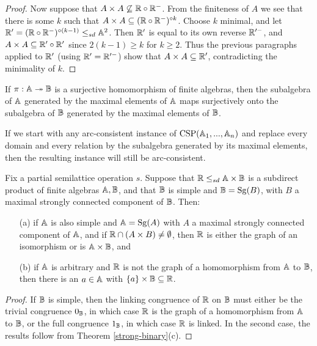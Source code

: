 \documentclass[letterpaper,11pt]{article}
\DeclareMathOperator{\CSP}{CSP}
\DeclareMathOperator{\Sg}{Sg}
\begin{document}
\begin{proof}
Now suppose that $A \times A \not\subseteq \mathbb{R}\circ \mathbb{R}^-$. From the finiteness of $A$ we see that there is some $k$ such that $A \times A \subseteq (\mathbb{R}\circ \mathbb{R}^-)^{\circ k}$. Choose $k$ minimal, and let $\mathbb{R}' = (\mathbb{R} \circ \mathbb{R}^-)^{\circ (k-1)} \le_{sd} \mathbb{A}^2$. Then $\mathbb{R}'$ is equal to its own reverse $\mathbb{R}'^-$, and $A \times A \subseteq \mathbb{R}' \circ \mathbb{R}'$ since $2(k-1) \ge k$ for $k \ge 2$. Thus the previous paragraphs applied to $\mathbb{R}'$ (using $\mathbb{R}' = \mathbb{R}'^-$) show that $A \times A \subseteq \mathbb{R}'$, contradicting the minimality of $k$.
\end{proof}


\begin{cor}\label{maximal-projection} If $\pi : \mathbb{A} \twoheadrightarrow \mathbb{B}$ is a surjective homomorphism of finite algebras, then the subalgebra of $\mathbb{A}$ generated by the maximal elements of $\mathbb{A}$ maps surjectively onto the subalgebra of $\mathbb{B}$ generated by the maximal elements of $\mathbb{B}$.
\end{cor}

\begin{cor} If we start with any arc-consistent instance of $\CSP(\bA_1, ..., \bA_n)$ and replace every domain and every relation by the subalgebra generated by its maximal elements, then the resulting instance will still be arc-consistent.
\end{cor}

\begin{cor}\label{strong-simple} Fix a partial semilattice operation $s$. Suppose that $\mathbb{R} \le_{sd} \mathbb{A}\times \mathbb{B}$ is a subdirect product of finite algebras $\mathbb{A}, \mathbb{B}$, and that $\mathbb{B}$ is simple and $\bB = \Sg(B)$, with $B$ a maximal strongly connected component of $\mathbb{B}$. Then:
\begin{itemize}
\item[(a)] if $\mathbb{A}$ is also simple and $\bA = \Sg(A)$ with $A$ a maximal strongly connected component of $\mathbb{A}$, and if $\mathbb{R} \cap (A\times B) \ne \emptyset$, then $\mathbb{R}$ is either the graph of an isomorphism or is $\mathbb{A}\times \mathbb{B}$, and

\item[(b)] if $\mathbb{A}$ is arbitrary and $\mathbb{R}$ is not the graph of a homomorphism from $\mathbb{A}$ to $\mathbb{B}$, then there is an $a \in \mathbb{A}$ with $\{a\}\times \mathbb{B} \subseteq \mathbb{R}$.
\end{itemize}
\end{cor}
\begin{proof} If $\mathbb{B}$ is simple, then the linking congruence of $\mathbb{R}$ on $\mathbb{B}$ must either be the trivial congruence $0_{\mathbb{B}}$, in which case $\mathbb{R}$ is the graph of a homomorphism from $\mathbb{A}$ to $\mathbb{B}$, or the full congruence $1_{\mathbb{B}}$, in which case $\mathbb{R}$ is linked. In the second case, the results follow from Theorem \ref{strong-binary}(c).
\end{proof}
\end{document}
